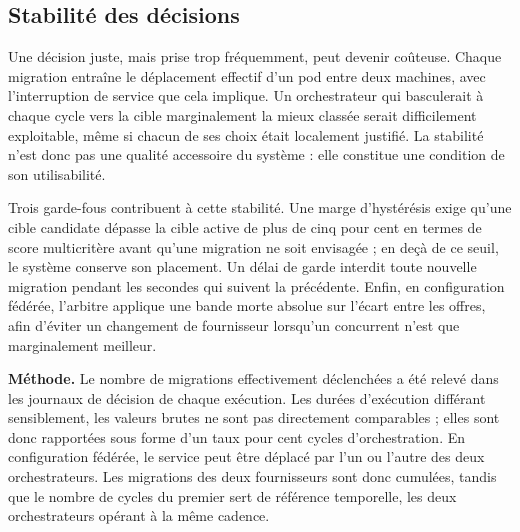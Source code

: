 \subsection{Stabilité des décisions}
\label{sec:stabilite-decisions}

Une décision juste, mais prise trop fréquemment, peut devenir coûteuse. Chaque migration entraîne le déplacement effectif d'un pod entre deux machines, avec l'interruption de service que cela implique. Un orchestrateur qui basculerait à chaque cycle vers la cible marginalement la mieux classée serait difficilement exploitable, même si chacun de ses choix était localement justifié. La stabilité n'est donc pas une qualité accessoire du système : elle constitue une condition de son utilisabilité.

Trois garde-fous contribuent à cette stabilité. Une marge d'hystérésis exige qu'une cible candidate dépasse la cible active de plus de cinq pour cent en termes de score multicritère avant qu'une migration ne soit envisagée ; en deçà de ce seuil, le système conserve son placement. Un délai de garde interdit toute nouvelle migration pendant les secondes qui suivent la précédente. Enfin, en configuration fédérée, l'arbitre applique une bande morte absolue sur l'écart entre les offres, afin d'éviter un changement de fournisseur lorsqu'un concurrent n'est que marginalement meilleur.

\textbf{Méthode.} Le nombre de migrations effectivement déclenchées a été relevé dans les journaux de décision de chaque exécution. Les durées d'exécution différant sensiblement, les valeurs brutes ne sont pas directement comparables ; elles sont donc rapportées sous forme d'un taux pour cent cycles d'orchestration. En configuration fédérée, le service peut être déplacé par l'un ou l'autre des deux orchestrateurs. Les migrations des deux fournisseurs sont donc cumulées, tandis que le nombre de cycles du premier sert de référence temporelle, les deux orchestrateurs opérant à la même cadence.

